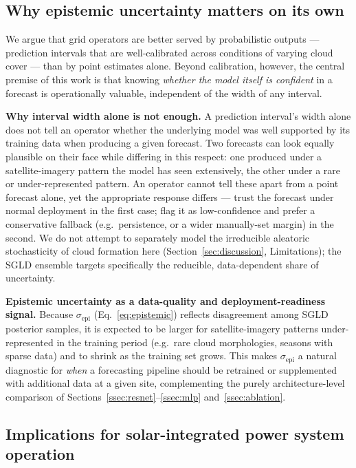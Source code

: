 \subsection{Why epistemic uncertainty matters on its own}
\label{ssec:uq_discussion}

We argue that grid operators are better served by probabilistic outputs ---
prediction intervals that are well-calibrated across conditions of varying
cloud cover --- than by point estimates alone. Beyond calibration, however,
the central premise of this work is that knowing \emph{whether the model
itself is confident} in a forecast is operationally valuable, independent of
the width of any interval.

\textbf{Why interval width alone is not enough.} A prediction interval's
width alone does not tell an operator whether the underlying model was well
supported by its training data when producing a given forecast. Two
forecasts can look equally plausible on their face while differing in this
respect: one produced under a satellite-imagery pattern the model has seen
extensively, the other under a rare or under-represented pattern. An
operator cannot tell these apart from a point forecast alone, yet the
appropriate response differs --- trust the forecast under normal deployment
in the first case; flag it as low-confidence and prefer a conservative
fallback (e.g.\ persistence, or a wider manually-set margin) in the second.
We do not attempt to separately model the irreducible aleatoric
stochasticity of cloud formation here (Section~\ref{sec:discussion},
Limitations); the SGLD ensemble targets specifically the reducible,
data-dependent share of uncertainty.

\textbf{Epistemic uncertainty as a data-quality and deployment-readiness
signal.} Because $\sigma_\text{epi}$ (Eq.~\ref{eq:epistemic}) reflects
disagreement among SGLD posterior samples, it is expected to be larger for
satellite-imagery patterns under-represented in the training period (e.g.\
rare cloud morphologies, seasons with sparse data) and to shrink as the
training set grows. This makes $\sigma_\text{epi}$ a natural diagnostic for
\emph{when} a forecasting pipeline should be retrained or supplemented with
additional data at a given site, complementing the purely architecture-level
comparison of Sections~\ref{ssec:resnet}--\ref{ssec:mlp} and~\ref{ssec:ablation}.

\subsection{Implications for solar-integrated power system operation}

